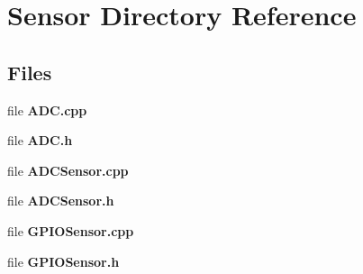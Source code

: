 \section{Sensor Directory Reference}
\label{dir_5db442826ecf4c2999e5ba14ba90214d}
\subsection*{Files}
\begin{DoxyCompactItemize}
\item 
file {\bfseries A\+D\+C.\+cpp}
\item 
file {\bfseries A\+D\+C.\+h}
\item 
file {\bfseries A\+D\+C\+Sensor.\+cpp}
\item 
file {\bfseries A\+D\+C\+Sensor.\+h}
\item 
file {\bfseries G\+P\+I\+O\+Sensor.\+cpp}
\item 
file {\bfseries G\+P\+I\+O\+Sensor.\+h}
\end{DoxyCompactItemize}
